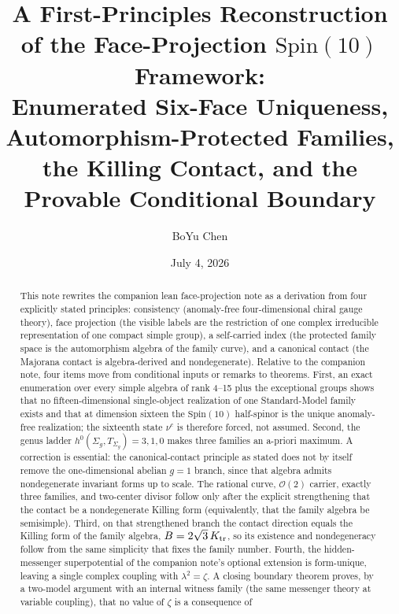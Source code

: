 \documentclass[
  aps,
  prd,
  preprint,
  nofootinbib,
  superscriptaddress,
  longbibliography
]{revtex4-2}
\newcommand{\Spin}{\mathrm{Spin}}
\newcommand{\cO}{\mathcal{O}}
\begin{document}
\title{\texorpdfstring{A First-Principles Reconstruction of the
Face-Projection \(\Spin(10)\) Framework:\\
Enumerated Six-Face Uniqueness, Automorphism-Protected Families,
the Killing Contact, and the Provable Conditional Boundary}
{A First-Principles Reconstruction of the Face-Projection Spin(10)
Framework}}
\author{BoYu Chen}
\date{July 4, 2026}

\begin{abstract}
This note rewrites the companion lean face-projection note as a derivation
from four explicitly stated principles: consistency (anomaly-free
four-dimensional chiral gauge theory), face projection (the visible labels
are the restriction of one complex irreducible representation of one compact
simple group), a self-carried index (the protected family space is the
automorphism algebra of the family curve), and a canonical contact (the
Majorana contact is algebra-derived and nondegenerate).  Relative to the
companion note, four items move from conditional inputs or remarks to
theorems.  First, an exact enumeration over every simple algebra of rank
4--15 plus the exceptional groups shows that no fifteen-dimensional
single-object realization of one Standard-Model family exists and that at
dimension sixteen the \(\Spin(10)\) half-spinor is the unique anomaly-free
realization; the sixteenth state \(\nu^c\) is therefore forced, not assumed.
Second, the genus ladder \(h^0(\Sigma_g,T_{\Sigma_g})=3,1,0\) makes three
families an a-priori maximum.  A correction is essential: the canonical-contact
principle as stated does not by itself remove the one-dimensional abelian
\(g=1\) branch, since that algebra admits nondegenerate invariant forms up to
scale.  The rational curve, \(\cO(2)\) carrier, exactly three families, and
two-center divisor follow only after the explicit strengthening that the
contact be a nondegenerate Killing form (equivalently, that the family algebra
be semisimple).  Third, on that strengthened branch the contact direction equals
the Killing form of the family algebra, \(B=2\sqrt3\,K_{\rm tr}\), so its
existence and nondegeneracy follow from the same simplicity that fixes the
family number.  Fourth, the hidden-messenger superpotential of the
companion note's optional extension is form-unique, leaving a single complex
coupling with \(\lambda^2=\zeta\).  A closing boundary theorem proves, by a
two-model argument with an internal witness family (the same messenger
theory at variable coupling), that no value of \(\zeta\) is a consequence of

\end{abstract}
\end{document}
